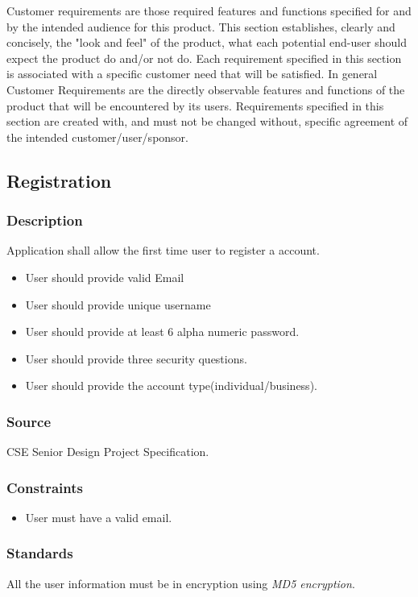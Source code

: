 Customer requirements are those required features and functions specified for and by the intended audience for this product. This section establishes, clearly and concisely, the "look and feel" of the product, what each potential end-user should expect the product do and/or not do. Each requirement specified in this section is associated with a specific customer need that will be satisfied. In general Customer Requirements are the directly observable features and functions of the product that will be encountered by its users. Requirements specified in this section are created with, and must not be changed without, specific agreement of the intended customer/user/sponsor.

\subsection{Registration}
\subsubsection{Description}
Application shall allow the first time user to register a account.
\begin{itemize}
\item User should provide valid Email
\item User should provide unique username
\item User should provide at least 6 alpha numeric password.
\item User should provide three security questions.
\item User should provide the account type(individual/business).
\end{itemize}

\subsubsection{Source}
CSE Senior Design Project Specification.
\subsubsection{Constraints}
\begin{itemize}
\item User must have a valid email. 
\end{itemize}

\subsubsection{Standards}
All the user information must be in encryption using \textit{MD5 encryption}.
